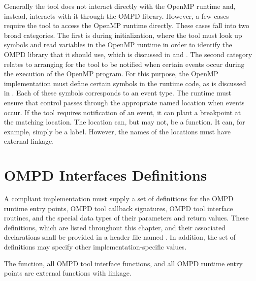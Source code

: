Generally the tool does not interact directly with the OpenMP runtime and, 
instead, interacts with it through the OMPD library. However, a few cases
require the tool to access the OpenMP runtime directly. These cases fall into 
two broad categories. The first is during initialization, where the tool must
look up symbols and read variables in the OpenMP runtime in order to identify 
the OMPD library that it should use, which is discussed in 
 and 
. The second category relates to 
arranging for the tool to be notified when certain events occur during the 
execution of the OpenMP program. For this purpose, the OpenMP implementation
must define certain symbols in the runtime code, as is discussed in 
. Each of these symbols corresponds 
to an event type. The runtime must ensure that control passes through the 
appropriate named location when events occur. If the tool requires notification 
of an event, it can plant a breakpoint at the matching location. The location 
can, but may not, be a function. It can, for example, simply be a label. However, 
the names of the locations must have external  linkage.

\section{OMPD Interfaces Definitions}
\label{sec:OMPD Interfaces Definitions}

\begin{ccppspecific}
A compliant implementation must supply a set of definitions for the OMPD runtime
entry points, OMPD tool
callback signatures, OMPD tool interface routines, and the special data types of
their parameters and return values. These definitions, which are listed throughout
this chapter, and their associated declarations shall be provided in a header file
named . In addition, the set of definitions may specify other
implementation-specific values.

The  function,
all OMPD tool interface functions, and all OMPD runtime entry points are
external functions with  linkage.
\end{ccppspecific}

